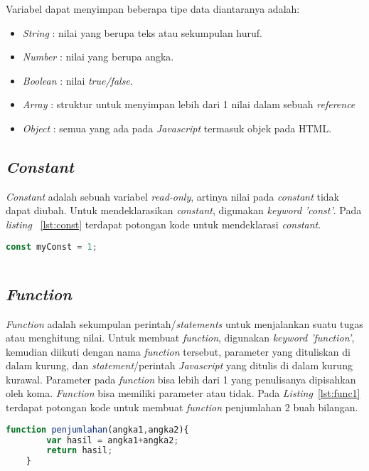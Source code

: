 Variabel dapat menyimpan beberapa tipe data diantaranya adalah:
\begin{itemize}
	\item \textit{String} : nilai yang berupa teks atau sekumpulan huruf.
	\item \textit{Number} : nilai yang berupa angka.
	\item \textit{Boolean} : nilai \textit{true/false}.
	\item \textit{Array} : struktur untuk menyimpan lebih dari 1 nilai dalam sebuah \textit{reference}
	\item \textit{Object} : semua yang ada pada \textit{Javascript} termasuk objek pada HTML.
\end{itemize}

\subsection{\textit{Constant}}
\textit{Constant} adalah sebuah variabel \textit{read-only}, artinya nilai pada \textit{constant} tidak dapat diubah. Untuk mendeklarasikan \textit{constant}, digunakan \textit{keyword 'const'}. Pada \textit{listing} ~\ref{lst:const} terdapat potongan kode untuk mendeklarasi \textit{constant}.

\begin{lstlisting}[language=Javascript, caption=Deklarasi \textit{constant}, label={lst:const}]
	const myConst = 1;
	
\end{lstlisting}

\subsection{\textit{Function}}
\textit{Function} adalah sekumpulan perintah/\textit{statements} untuk menjalankan suatu tugas atau menghitung nilai. Untuk membuat \textit{function}, digunakan \textit{keyword 'function'}, kemudian diikuti dengan nama \textit{function} tersebut, parameter yang dituliskan di dalam kurung, dan \textit{statement}/perintah \textit{Javascript} yang ditulis di dalam kurung kurawal. Parameter pada \textit{function} bisa lebih dari 1 yang penulisanya dipisahkan oleh koma. \textit{Function} bisa memiliki parameter atau tidak. Pada \textit{Listing}~\ref{lst:func1} terdapat potongan kode untuk membuat \textit{function} penjumlahan 2 buah bilangan.

\begin{lstlisting}[language=Javascript, caption=\textit{Function} penjumlahan 2 buah bilangan, label={lst:func1}]
	function penjumlahan(angka1,angka2){
		var hasil = angka1+angka2;
		return hasil;
	}
	
\end{lstlisting}

